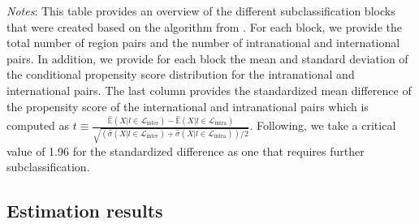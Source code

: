  \begin{table}[H]
    \centering
    \caption{Propensity score estimation: Estimation}
    \label{tab: app_prop_score_blocks}
    \begin{spacing}{1}
    \end{spacing}
    \parbox{1\textwidth}{
    \vspace{10pt}
    \begin{spacing}{1} 
        {\footnotesize 
        \textit{Notes}: This table provides an overview of the different subclassification blocks that were created based on the algorithm from \citet{Imbens2015}. For each block, we provide the total number of region pairs and the number of intranational and international pairs. In addition, we provide for each block the mean and standard deviation of the conditional propensity score distribution for the intranational and international pairs. The last column provides the standardized mean difference of the propensity score of the international and intranational pairs which is computed as $t\equiv
        \frac{\hat{\mathbb{E}}(X|l\in\mathcal{L}_{\text{inter}})-\hat{\mathbb{E}}(X|l \in \mathcal{L}_{\text{intra}})}
             {\sqrt{\left(\hat{\sigma}(X|l \in \mathcal{L}_{\text{inter}}) + \hat{\sigma}(X|l \in \mathcal{L}_{\text{intra}})\right)/2}}$. Following, \citet{Imbens2015} we take a critical value of 1.96 for the standardized difference as one that requires further subclassification.}
        \end{spacing}}
\end{table}

\subsection{Estimation results}

